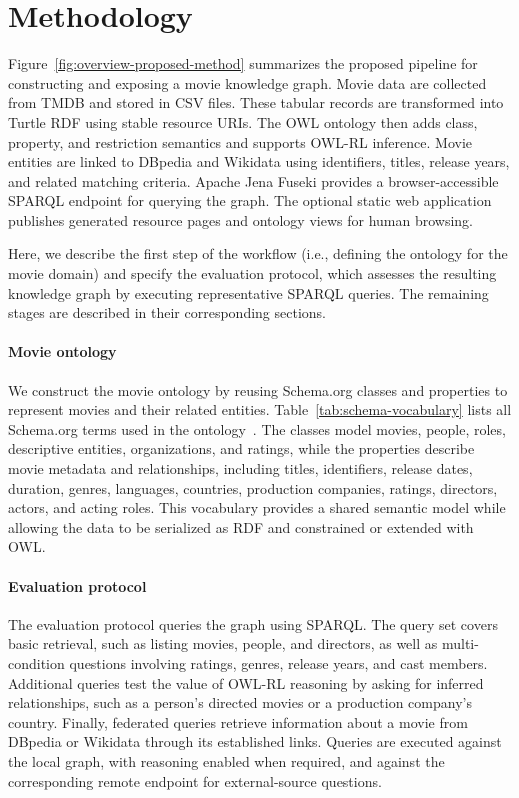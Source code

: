 \section{Methodology}\label{sec:method}
Figure~\ref{fig:overview-proposed-method} summarizes the proposed pipeline for
constructing and exposing a movie knowledge graph. Movie data are collected from TMDB and stored in CSV
files. These tabular records are transformed into Turtle RDF using stable
resource URIs. The OWL ontology then adds class, property, and restriction
semantics and supports OWL-RL inference. Movie entities are linked to DBpedia
and Wikidata using identifiers, titles, release years, and related matching
criteria. Apache Jena Fuseki provides a browser-accessible SPARQL endpoint for
querying the graph. The optional static web application publishes generated
resource pages and ontology views for human browsing.

Here, we describe the first step of the workflow
(i.e., defining the ontology for the movie domain) and specify the evaluation protocol,
which assesses the resulting knowledge graph by executing representative SPARQL queries. The
remaining stages are described in their corresponding sections.

\paragraph{Movie ontology}

We construct the movie ontology by reusing Schema.org classes and properties
to represent movies and their related entities. Table~\ref{tab:schema-vocabulary}
lists all Schema.org terms used in the ontology~\citep{schemaorg2025}. The classes model movies,
people, roles, descriptive entities, organizations, and ratings, while the
properties describe movie metadata and relationships, including titles,
identifiers, release dates, duration, genres, languages, countries, production
companies, ratings, directors, actors, and acting roles. This vocabulary
provides a shared semantic model while allowing the data to be serialized as
RDF and constrained or extended with OWL.

\paragraph{Evaluation protocol}

The evaluation protocol queries the graph using SPARQL. The query set covers
basic retrieval, such as listing movies, people, and directors, as well as
multi-condition questions involving ratings, genres, release years, and cast
members. Additional queries test the value of OWL-RL reasoning by asking for
inferred relationships, such as a person's directed movies or a production
company's country. Finally, federated queries retrieve information about a
movie from DBpedia or Wikidata through its established links. Queries are
executed against the local graph, with reasoning enabled when required, and
against the corresponding remote endpoint for external-source questions.

